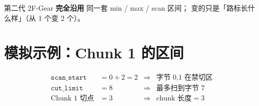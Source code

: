 \begin{warnbox}[两代共用]
第二代 2F-Gear \textbf{完全沿用} 同一套 min / max / scan 区间；  
变的只是「路标长什么样」（从 1 个变 2 个）。
\end{warnbox}

\section{模拟示例：Chunk 1 的区间}

\begin{simbox}[pos=0 时三个变量]
\begin{align*}
\texttt{scan\_start} &= 0 + 2 = 2 &\Rightarrow& \text{字节 0,1 在禁切区} \\
\texttt{cut\_limit} &= 8 &\Rightarrow& \text{最多扫到字节 7} \\
\text{Chunk 1 切点} &= 3 &\Rightarrow& \text{chunk 长度} = 3
\end{align*}
\end{simbox}
